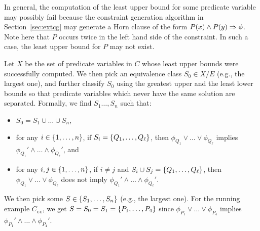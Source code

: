 In general, the computation of the least upper bound for some predicate
variable may possibly fail because the constraint generation algorithm
in Section~\ref{sec:extcg} may generate a Horn clause of the form
\(P(x)\land P(y) \Rightarrow \phi\).  Note here that \(P\) occurs twice in
the left hand side of the constraint.  In such a case, the least upper
bound for \(P\) may not exist.

Let \(X\) be the set of predicate variables in \(C\) whose least upper
bounds were successfully computed.  We then pick an equivalence class
\(S_0 \in X / E\) (e.g., the largest one), and further classify \(S_0\)
using the greatest upper and the least lower bounds so that predicate
variables which never have the same solution are separated.
%
Formally, we find \(S_1\dots,S_n\) such that:
\vspace{-4pt}
\begin{itemize}
\item \(S_0 = S_1 \cup \dots \cup S_n\),
\item for any \(i \in \{{1,\dots,n}\}\), if \(S_i
=\{{Q_1,\dots,Q_{\ell}}\}\), then \(\phi_{Q_1} \lor \dots \lor
\phi_{Q_{\ell}}\) implies \(\phi_{Q_1}' \land \dots \land
\phi_{Q_{\ell}}'\), and \item for any \(i,j \in \{{1,\dots,n}\}\), if
\(i \neq j\) and \(S_i \cup S_j = \{{Q_1,\dots,Q_{\ell}}\}\), then
\(\phi_{Q_1} \lor \dots \lor \phi_{Q_{\ell}}\) does not imply
\(\phi_{Q_1}' \land \dots \land \phi_{Q_{\ell}}'\).
\end{itemize}
\vspace{-4pt}
We then pick some \(S \in \{{S_1,\dots,S_n}\}\) (e.g., the largest one).
%
For the running example \(C_{\texttt{cc}}\), we get
\(S=S_0=S_1=\{{P_1,\dots,P_4}\}\) since \(\phi_{P_1} \lor \dots
\lor\phi_{P_4}\) implies \(\phi_{P_1}' \land \dots \land \phi_{P_4}'\).


